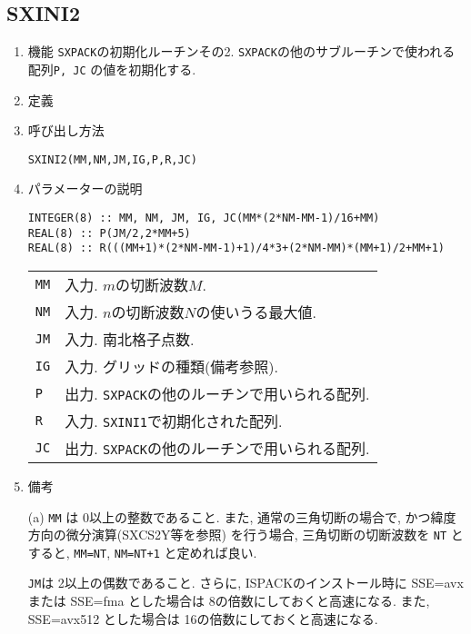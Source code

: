 \documentclass[a4j]{jsarticle}
\begin{document}

\subsection{SXINI2}

\begin{enumerate}

\item 機能
\texttt{SXPACK}の初期化ルーチンその2.
\texttt{SXPACK}の他のサブルーチンで使われる配列\texttt{P, JC}
の値を初期化する.

\item 定義

\item 呼び出し方法 
    
\texttt{SXINI2(MM,NM,JM,IG,P,R,JC)}
  
\item パラメーターの説明

\begin{verbatim}  
INTEGER(8) :: MM, NM, JM, IG, JC(MM*(2*NM-MM-1)/16+MM)
REAL(8) :: P(JM/2,2*MM+5)
REAL(8) :: R(((MM+1)*(2*NM-MM-1)+1)/4*3+(2*NM-MM)*(MM+1)/2+MM+1)
\end{verbatim}  
    
\begin{tabular}{ll}
\texttt{MM} & 入力. $m$の切断波数$M$.\\
\texttt{NM} & 入力. $n$の切断波数$N$の使いうる最大値.\\
\texttt{JM} & 入力. 南北格子点数.\\
\texttt{IG} & 入力. グリッドの種類(備考参照).\\
\texttt{P}  & 出力. \texttt{SXPACK}の他のルーチンで用いられる配列.\\
\texttt{R}  & 入力. \texttt{SXINI1}で初期化された配列.\\
\texttt{JC}  & 出力. \texttt{SXPACK}の他のルーチンで用いられる配列.
\end{tabular}

\item 備考

(a) \texttt{MM} は 0以上の整数であること.
     また, 通常の三角切断の場合で, かつ緯度方向の微分演算(SXCS2Y等を参照)
     を行う場合, 三角切断の切断波数を \texttt{NT} とすると,
     \texttt{MM=NT},  \texttt{NM=NT+1} と定めれば良い.
     
\texttt{JM}は 2以上の偶数であること. さらに, ISPACKのインストール時に
SSE=avx または SSE=fma とした場合は 8の倍数にしておくと高速になる.
また, SSE=avx512 とした場合は 16の倍数にしておくと高速になる.


\end{enumerate}
\end{document}
